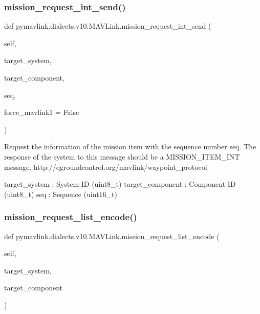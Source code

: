 \begin{DoxyVerb}
\begin{DoxyVerb}
\begin{DoxyVerb}
\begin{DoxyVerb}
\subsubsection{\texorpdfstring{mission\+\_\+request\+\_\+int\+\_\+send()}{mission\_request\_int\_send()}}
{\footnotesize\ttfamily def pymavlink.\+dialects.\+v10.\+M\+A\+V\+Link.\+mission\+\_\+request\+\_\+int\+\_\+send (\begin{DoxyParamCaption}\item[{}]{self,  }\item[{}]{target\+\_\+system,  }\item[{}]{target\+\_\+component,  }\item[{}]{seq,  }\item[{}]{force\+\_\+mavlink1 = {\ttfamily False} }\end{DoxyParamCaption})}

\begin{DoxyVerb}Request the information of the mission item with the sequence number
seq. The response of the system to this message should
be a MISSION_ITEM_INT message.
http://qgroundcontrol.org/mavlink/waypoint_protocol

target_system             : System ID (uint8_t)
target_component          : Component ID (uint8_t)
seq                       : Sequence (uint16_t)\end{DoxyVerb}
 \mbox{\label{classpymavlink_1_1dialects_1_1v10_1_1MAVLink_aec3dae7c3533513fe591e49e7a670ec6}} 
\subsubsection{\texorpdfstring{mission\+\_\+request\+\_\+list\+\_\+encode()}{mission\_request\_list\_encode()}}
{\footnotesize\ttfamily def pymavlink.\+dialects.\+v10.\+M\+A\+V\+Link.\+mission\+\_\+request\+\_\+list\+\_\+encode (\begin{DoxyParamCaption}\item[{}]{self,  }\item[{}]{target\+\_\+system,  }\item[{}]{target\+\_\+component }\end{DoxyParamCaption})}


\end{DoxyVerb}
\end{DoxyVerb}
\end{DoxyVerb}
\end{DoxyVerb}
